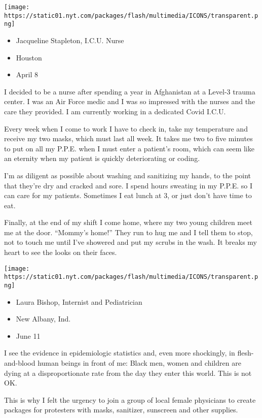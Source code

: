 \texttt{[image: https://static01.nyt.com/packages/flash/multimedia/ICONS/transparent.png]}

\begin{itemize}
\tightlist
\item
  Jacqueline Stapleton, I.C.U. Nurse
\item
  Houston
\item
  April 8
\end{itemize}

I decided to be a nurse after spending a year in Afghanistan at a
Level-3 trauma center. I was an Air Force medic and I was so impressed
with the nurses and the care they provided. I am currently working in a
dedicated Covid I.C.U.

Every week when I come to work I have to check in, take my temperature
and receive my two masks, which must last all week. It takes me two to
five minutes to put on all my P.P.E. when I must enter a patient's room,
which can seem like an eternity when my patient is quickly deteriorating
or coding.

I'm as diligent as possible about washing and sanitizing my hands, to
the point that they're dry and cracked and sore. I spend hours sweating
in my P.P.E. so I can care for my patients. Sometimes I eat lunch at 3,
or just don't have time to eat.

Finally, at the end of my shift I come home, where my two young children
meet me at the door. ``Mommy's home!'' They run to hug me and I tell
them to stop, not to touch me until I've showered and put my scrubs in
the wash. It breaks my heart to see the looks on their faces.

\texttt{[image: https://static01.nyt.com/packages/flash/multimedia/ICONS/transparent.png]}

\begin{itemize}
\tightlist
\item
  Laura Bishop, Internist and Pediatrician
\item
  New Albany, Ind.
\item
  June 11
\end{itemize}

I see the evidence in epidemiologic statistics and, even more
shockingly, in flesh-and-blood human beings in front of me: Black men,
women and children are dying at a disproportionate rate from the day
they enter this world. This is not OK.

This is why I felt the urgency to join a group of local female
physicians to create packages for protesters with masks, sanitizer,
sunscreen and other supplies.

